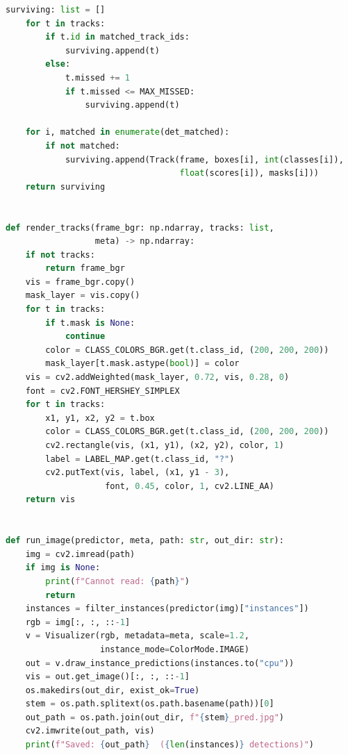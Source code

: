 \documentclass[14pt,a4paper]{extreport}
\begin{document}
\begin{lstlisting}[language=Python]
    surviving: list = []
    for t in tracks:
        if t.id in matched_track_ids:
            surviving.append(t)
        else:
            t.missed += 1
            if t.missed <= MAX_MISSED:
                surviving.append(t)

    for i, matched in enumerate(det_matched):
        if not matched:
            surviving.append(Track(frame, boxes[i], int(classes[i]),
                                   float(scores[i]), masks[i]))
    return surviving


def render_tracks(frame_bgr: np.ndarray, tracks: list,
                  meta) -> np.ndarray:
    if not tracks:
        return frame_bgr
    vis = frame_bgr.copy()
    mask_layer = vis.copy()
    for t in tracks:
        if t.mask is None:
            continue
        color = CLASS_COLORS_BGR.get(t.class_id, (200, 200, 200))
        mask_layer[t.mask.astype(bool)] = color
    vis = cv2.addWeighted(mask_layer, 0.72, vis, 0.28, 0)
    font = cv2.FONT_HERSHEY_SIMPLEX
    for t in tracks:
        x1, y1, x2, y2 = t.box
        color = CLASS_COLORS_BGR.get(t.class_id, (200, 200, 200))
        cv2.rectangle(vis, (x1, y1), (x2, y2), color, 1)
        label = LABEL_MAP.get(t.class_id, "?")
        cv2.putText(vis, label, (x1, y1 - 3),
                    font, 0.45, color, 1, cv2.LINE_AA)
    return vis


def run_image(predictor, meta, path: str, out_dir: str):
    img = cv2.imread(path)
    if img is None:
        print(f"Cannot read: {path}")
        return
    instances = filter_instances(predictor(img)["instances"])
    rgb = img[:, :, ::-1]
    v = Visualizer(rgb, metadata=meta, scale=1.2,
                   instance_mode=ColorMode.IMAGE)
    out = v.draw_instance_predictions(instances.to("cpu"))
    vis = out.get_image()[:, :, ::-1]
    os.makedirs(out_dir, exist_ok=True)
    stem = os.path.splitext(os.path.basename(path))[0]
    out_path = os.path.join(out_dir, f"{stem}_pred.jpg")
    cv2.imwrite(out_path, vis)
    print(f"Saved: {out_path}  ({len(instances)} detections)")



\end{lstlisting}
\end{document}
